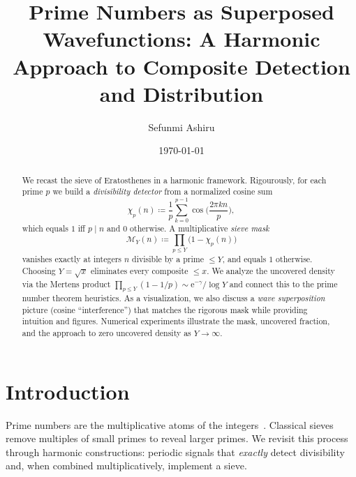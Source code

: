 \documentclass[reprint,amsmath,amssymb,aps,pra]{revtex4-2}
\begin{document}
\title{Prime Numbers as Superposed Wavefunctions: A Harmonic Approach to Composite Detection and Distribution}

\author{Sefunmi Ashiru}

\date{\today}

\begin{abstract}
%

We recast the sieve of Eratosthenes in a harmonic framework. Rigourously, for each prime $p$ we build a \emph{divisibility detector} from a normalized cosine sum
\[
\chi_p(n)\coloneqq \frac{1}{p}\sum_{k=0}^{p-1}\cos\!\Big(\frac{2\pi k n}{p}\Big),
\]
which equals $1$ iff $p\mid n$ and $0$ otherwise. A multiplicative \emph{sieve mask}
\[
\mathcal{M}_Y(n)\coloneqq \prod_{p\le Y}\bigl(1-\chi_p(n)\bigr)
\]
vanishes exactly at integers $n$ divisible by a prime $\le Y$, and equals $1$ otherwise. Choosing $Y=\sqrt{x}$ eliminates every composite $\le x$. We analyze the uncovered density via the Mertens product $\prod_{p\le Y}(1-1/p)\sim \mathrm{e}^{-\gamma}/\log Y$ and connect this to the prime number theorem heuristics. As a visualization, we also discuss a \emph{wave superposition} picture (cosine “interference”) that matches the rigorous mask while providing intuition and figures. Numerical experiments illustrate the mask, uncovered fraction, and the approach to zero uncovered density as $Y\to\infty$.
\end{abstract}

\maketitle

\section{Introduction}

Prime numbers are the multiplicative atoms of the integers~\cite{HardyWright}. Classical sieves remove multiples of small primes to reveal larger primes. We revisit this process through harmonic constructions: periodic signals that \emph{exactly} detect divisibility and, when combined multiplicatively, implement a sieve.
\end{document}
